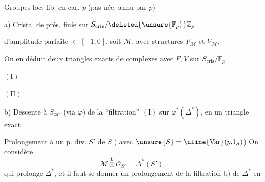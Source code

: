 Groupes loc. lib. en car. $p$ (pas néc. annu par $p$)

a) Cristal de prés. finie sur $S_{\mathrm{cris}}/\deleted{\unsure{\mathbb F_p}}\mathbb Z_p$

d'amplitude parfaite $\subset[-1,0]$, soit $\mathcal M$,
avec structures $F_{\mathcal M}$ et $V_{\mathcal M}$.

On en déduit deux triangles exacts de complexes avec $F,V$ sur $S_{\mathrm{cris}}/\mathbb F_p$

$(\mathrm I)$
\margin{$\Delta^*=\varepsilon^*(\mathbb\Delta^*)$}

$(\mathrm {II})$

b)  Descente à $S_{\mathrm{zar}}$ (via $\varphi$) de la ``filtration'' $(\mathrm I)$ sur $\varphi^*(\Delta^*)$, en un triangle exact

Prolongement à un  p. div. $S'$ de $S$
( avec $\unsure{S}=\uline{\operatorname{Var}}(p.1_S)$) On considère
\[
\mathcal M\overset L\otimes\mathcal O_{S'}=\Delta^*(S'),
\]
qui prolonge $\Delta^*$, et il faut se donner un prolongement de la filtration b) de $\Delta^*$ en
